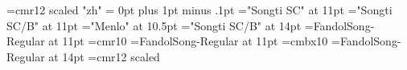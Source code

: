 
\hsize=17cm                     %
\vsize=24.5cm                   %
\parindent=0pt                  %
\baselineskip=14pt
\ifx\utfinputmode\undefined
  \ifx\XeTeXrevision\undefined
    \font\sectfont=cmr12 scaled      %
  \else
    \XeTeXlinebreaklocale "zh"                 %
    \XeTeXlinebreakskip = 0pt plus 1pt minus .1pt
    \font\tenrm="Songti SC" at 11pt            %
    \font\tenbf="Songti SC/B" at 11pt          %
    \font\tentt="Menlo" at 10.5pt              %
    \font\sectfont="Songti SC/B" at 14pt       %
    \tenrm                                     %
    \baselineskip=16pt
  \fi
\else
  \font\tenrm=FandolSong-Regular at 11pt
  \ifx\tenrm\nullfont \font\tenrm=cmr10 \fi
  \font\tenbf=FandolSong-Regular at 11pt
  \ifx\tenbf\nullfont \font\tenbf=cmbx10 \fi
  \font\sectfont=FandolSong-Regular at 14pt
  \ifx\sectfont\nullfont \font\sectfont=cmr12 scaled  \fi
  \tenrm
  \baselineskip=16pt
